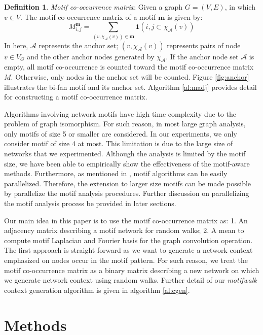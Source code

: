 \documentclass{article}
\theoremstyle{definition}
\newtheorem{definition}{Definition}[section]
\begin{document}
\begin{definition} \emph{Motif co-occurrence matrix}:
Given a graph $G = (V,E)$, in which $v \in V$. The motif co-occurrence 
matrix of a motif $\mathbf{m}$ is given by:
$$M_{i,j}^{\mathbf{m}} = \sum_{(v, \chi_{\mathcal{A}}(v)) \in \mathbf{m}} \mathbf{1}({i,j} \subset \chi_\mathcal{A}(v))$$
In here, $\mathcal{A}$ represents the anchor set; 
$(v, \chi_{\mathcal{A}}(v))$ represents pairs of node $v \in V_G$ and the 
other anchor nodes generated by $\chi_\mathcal{A}$. If the anchor node set 
$\mathcal{A}$ is empty, all motif co-occurrence is counted toward the 
motif co-occurrence matrix $M$. Otherwise, only nodes in the anchor set 
will be counted. Figure \ref{fig:anchor} illustrates the bi-fan motif and 
its anchor set. Algorithm \ref{al:madj} provides detail for constructing
a motif co-occurrence matrix.
\end{definition}

Algorithms involving network motifs have high time complexity due to
the problem of graph isomorphism. For such reason, in most large graph
analysis, only motifs of size 5 or smaller are considered. In our 
experiments, we only consider motif of size 4 at most. This limitation is 
due to the large size of networks that we experimented. Although the
analysis is limited by the motif size, we have been able to empirically 
show the effectiveness of the motif-aware methods. Furthermore, as 
mentioned in \cite{juremotif}, motif algorithms can be easily 
parallelized. Therefore, the extension to larger size motifs can be made 
possible by parallelize the motif analysis procedures. Further discussion 
on parallelizing the motif analysis process be provided in later 
sections.

Our main idea in this paper is to use the motif co-occurrence matrix as: 
1. An adjacency matrix describing a motif network for random walks; 2. A 
mean to compute motif Laplacian and Fourier basis for the graph 
convolution operation. The first approach is straight forward as we want 
to generate a network context emphasized on nodes occur in the motif 
pattern. For such reason, we treat the motif co-occurrence matrix as a 
binary matrix describing a new network on which we generate network 
context using random walks. Further detail of our \emph{motifwalk} context 
generation algorithm is given in algorithm \ref{al:cgen}.

\section{Methods}
\end{document}

